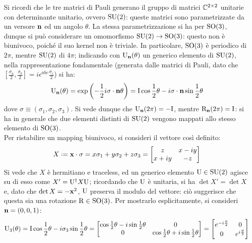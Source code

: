 Si ricordi che le tre matrici di Pauli generano il gruppo di matrici $ \mathbb{C}^{2\times2} $ unitarie con determinante unitario, ovvero $ \mathrm{SU}(2) $: queste matrici sono parametrizzate da un versore $ \mathbf{n} $ ed un angolo $ \theta $. La stessa parametrizzazione si ha per $ \mathrm{SO}(3) $, dunque si può considerare un omomorfismo $ \mathrm{SU}(2) \rightarrow \mathrm{SO}(3) $: questo non è biunivoco, poiché il suo kernel non è triviale. In particolare, $ \mathrm{SO}(3) $ è periodico di $ 2\pi $, mentre $ \mathrm{SU}(2) $ di $ 4\pi $; indicando con $ \mathrm{U}_{\mathbf{n}}(\theta) $ un generico elemento di $ \mathrm{SU}(2) $, nella rappresentazione fondamentale (generata dalle matrici di Pauli, dato che $ [\frac{\sigma_a}{2}, \frac{\sigma_b}{2}] = i \epsilon^{abc} \frac{\sigma_c}{2} $) si ha:
\begin{equation}
	\mathrm{U}_{\mathbf{n}}(\theta) = \exp \left( -\frac{1}{2} i \sigma \cdot \mathbf{n} \theta \right) = \mathrm{I} \cos \frac{1}{2}\theta - i \sigma \cdot \mathbf{n} \sin \frac{1}{2}\theta
	\label{eq:10.19}
\end{equation}
dove $ \sigma \equiv \left( \sigma_1, \sigma_2, \sigma_3 \right) $. Si vede dunque che $ \mathrm{U}_{\mathbf{n}}(2\pi) = -\mathrm{I} $, mentre $ \mathrm{R}_{\mathbf{n}}(2\pi) = \mathrm{I} $: si ha in generale che due elementi distinti di $ \mathrm{SU}(2) $ vengono mappati allo stesso elemento di $ \mathrm{SO}(3) $.\\
Per ristabilire un mapping biunivoco, si consideri il vettore così definito:
\begin{equation*}
	X \defeq \ve{x} \cdot \sigma = x \sigma_1 + y \sigma_2 + z \sigma_3 =
	\begin{bmatrix}
		z & x - i y \\
		x + i y & -z
	\end{bmatrix}
\end{equation*}
Si vede che $ X $ è hermitiano e traceless, ed un generico elemento $ \mathrm{U} \in \mathrm{SU}(2) $ agisce su di esso come $ X' = \mathrm{U}^{\dagger} X \mathrm{U} $; ricordando che $ \mathrm{U} $ è unitaria, si ha $ \det X' = \det X $ e, dato che $ \det X = -\mathbf{x}^2 $, $ \mathrm{U} $ preserva il modulo del vettore: ciò suggerisce che questa sia una rotazione $ \mathrm{R} \in \mathrm{SO}(3) $. Per mostrarlo esplicitamente, si consideri $ \mathbf{n} = (0,0,1) $:
\begin{equation*}
	\mathrm{U}_3(\theta) = \mathrm{I} \cos \frac{1}{2} \theta - i \sigma_3 \sin \frac{1}{2} \theta =
	\begin{bmatrix}
		\cos \frac{1}{2} \theta - i \sin \frac{1}{2} \theta & 0 \\
		0 & \cos \frac{1}{2} \theta + i \sin \frac{1}{2} \theta
	\end{bmatrix}
	=
	\begin{bmatrix}
		e^{-i \frac{\phi}{2}} & 0 \\ 0 & e^{i \frac{\phi}{2}}
	\end{bmatrix}
\end{equation*}
